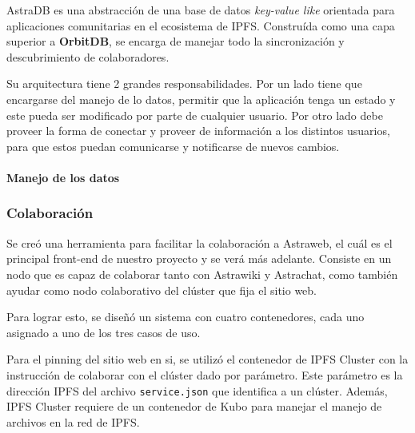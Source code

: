 AstraDB es una abstracción de una base de datos \textit{key-value like} orientada para aplicaciones comunitarias en el ecosistema de IPFS. Construída como una capa superior a \textbf{OrbitDB}\cite{orbitdb}, se encarga de manejar todo la sincronización y descubrimiento de colaboradores.

Su arquitectura tiene 2 grandes responsabilidades. Por un lado tiene que encargarse del manejo de lo datos, permitir que la aplicación tenga un estado y este pueda ser modificado por parte de cualquier usuario. Por otro lado debe proveer la forma de conectar y proveer de información a los distintos usuarios, para que estos puedan comunicarse y notificarse de nuevos cambios.

\paragraph{Manejo de los datos}


\subsubsection{Colaboración}

Se creó una herramienta para facilitar la colaboración a Astraweb, el cuál es el principal front-end de nuestro proyecto y se verá más adelante. Consiste en un nodo que es capaz de colaborar tanto con Astrawiki y Astrachat, como también ayudar como nodo colaborativo del clúster que fija el sitio web.

Para lograr esto, se diseñó un sistema con cuatro contenedores, cada uno asignado a uno de los tres casos de uso.

Para el pinning del sitio web en si, se utilizó el contenedor de IPFS Cluster con la instrucción de colaborar con el clúster dado por parámetro. Este parámetro es la dirección IPFS del archivo \texttt{service.json} que identifica a un clúster. Además, IPFS Cluster requiere de un contenedor de Kubo para manejar el manejo de archivos en la red de IPFS.

